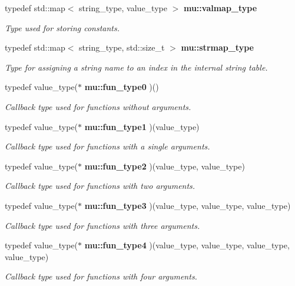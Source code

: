 \begin{CompactItemize}
typedef std::map$<$ string\_\-type, value\_\-type $>$ {\bf mu::valmap\_\-type}
\begin{CompactList}\small\item\em Type used for storing constants. \item\end{CompactList}\item 
typedef std::map$<$ string\_\-type, std::size\_\-t $>$ {\bf mu::strmap\_\-type}
\begin{CompactList}\small\item\em Type for assigning a string name to an index in the internal string table. \item\end{CompactList}\item 
typedef value\_\-type($\ast$ {\bf mu::fun\_\-type0} )()
\begin{CompactList}\small\item\em Callback type used for functions without arguments. \item\end{CompactList}\item 
typedef value\_\-type($\ast$ {\bf mu::fun\_\-type1} )(value\_\-type)
\begin{CompactList}\small\item\em Callback type used for functions with a single arguments. \item\end{CompactList}\item 
typedef value\_\-type($\ast$ {\bf mu::fun\_\-type2} )(value\_\-type, value\_\-type)
\begin{CompactList}\small\item\em Callback type used for functions with two arguments. \item\end{CompactList}\item 
typedef value\_\-type($\ast$ {\bf mu::fun\_\-type3} )(value\_\-type, value\_\-type, value\_\-type)
\begin{CompactList}\small\item\em Callback type used for functions with three arguments. \item\end{CompactList}\item 
typedef value\_\-type($\ast$ {\bf mu::fun\_\-type4} )(value\_\-type, value\_\-type, value\_\-type, value\_\-type)
\begin{CompactList}\small\item\em Callback type used for functions with four arguments. \item\end{CompactList}\item 

\end{CompactItemize}
